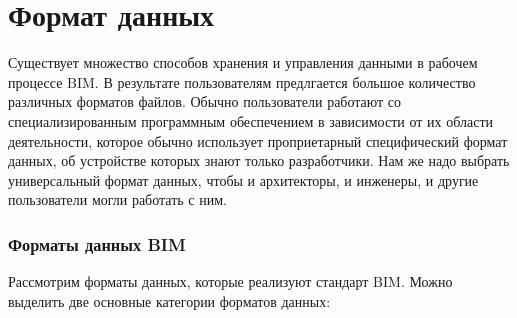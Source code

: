 \documentclass[a4paper,14pt]{extreport} %
\begin{document}
\newpage
\section{Формат данных}

Существует множество способов хранения и управления данными в рабочем процессе BIM. В результате пользователям предлгается большое количество различных форматов файлов.
Обычно пользователи работают со специализированным программным обеспечением в зависимости от их области деятельности, которое обычно использует проприетарный специфический формат данных, об устройстве которых знают только разработчики. Нам же надо выбрать универсальный формат данных, чтобы и архитекторы, и инженеры, и другие пользователи могли работать с ним.

\subsubsection{Форматы данных BIM}
Рассмотрим форматы данных, которые реализуют стандарт BIM.
Можно выделить две основные категории форматов данных:
\end{document}
